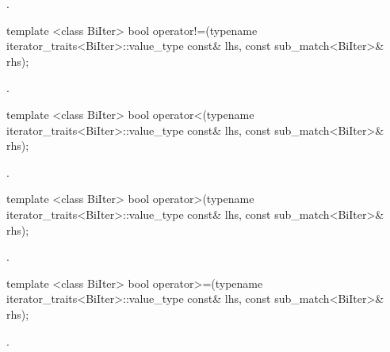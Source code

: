 \begin{itemdescr}
\pnum
\returns {}.
\end{itemdescr}

%
%
\begin{itemdecl}
template <class BiIter> 
  bool operator!=(typename iterator_traits<BiIter>::value_type const& lhs, 
                  const sub_match<BiIter>& rhs); 
\end{itemdecl}

\begin{itemdescr}
\pnum
\returns {}.
\end{itemdescr}

%
%
\begin{itemdecl}
template <class BiIter> 
  bool operator<(typename iterator_traits<BiIter>::value_type const& lhs, 
                 const sub_match<BiIter>& rhs); 
\end{itemdecl}

\begin{itemdescr}
\pnum
\returns {}.
\end{itemdescr}

%
%
\begin{itemdecl}
template <class BiIter> 
  bool operator>(typename iterator_traits<BiIter>::value_type const& lhs, 
                 const sub_match<BiIter>& rhs); 
\end{itemdecl}

\begin{itemdescr}
\pnum
\returns {}.
\end{itemdescr}

%
%
\begin{itemdecl}
template <class BiIter> 
  bool operator>=(typename iterator_traits<BiIter>::value_type const& lhs, 
                  const sub_match<BiIter>& rhs); 
\end{itemdecl}

\begin{itemdescr}
\pnum
\returns {}.
\end{itemdescr}

